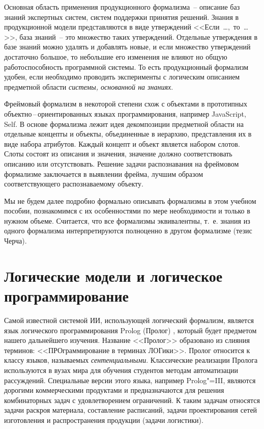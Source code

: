 \documentclass[a4paper,14pt, openany, twoside, final]{extbook} %
\begin{document}
Основная область применения продукционного формализма~-- описание баз знаний экспертных систем, систем поддержки принятия решений.  Знания в продукционной модели представляются в виде утверждений <<Если\ \ldots{},\ то\ \ldots{}>>, база знаний~-- это множество таких утверждений.  Отдельные утверждения в базе знаний можно удалять и добавлять новые, и если множество утверждений достаточно большое, то небольшие его изменения не влияют но общую работоспособность программной системы.  То есть продукционный формализм удобен, если необходимо проводить эксперименты с логическим описанием предметной области \emph{системы, основанной на знаниях}.

Фреймовый формализм в некоторой степени схож с объектами в прототипных объектно\,--\,ориентированных языках программирования, например JavaScript, Self.  В основе формализма лежит идея декомпозиции предметной области на отдельные концепты и объекты, объединенные в иерархию, представления их в виде набора атрибутов.  Каждый концепт и объект является набором слотов.  Слоты состоят из описания и значения, значение должно соответствовать описанию или отсутствовать.  Решение задачи распознавания на фреймовом формализме заключается в выявлении фрейма, лучшим образом соответствующего распознаваемому объекту.

Мы не будем далее подробно формально описывать формализмы в этом учебном пособии, познакомимся с их особенностями по мере необходимости и только в нужном объеме.  Считается, что все формализмы эквивалентны, т.~е. знания из одного формализма интерпретируются полноценно в другом формализме (тезис Черча).

\chapter{Логические модели и логическое программирование}

Самой известной системой ИИ, использующей логический формализм, является язык логического программирования \foreignlanguage{english}{Prolog} (Пролог) \cite{Bratko}, который будет предметом нашего дальнейшего изучения.  Название <<Пролог>> образовано из слияния терминов: <<ПРОграммирование в терминах ЛОГики>>. Пролог относится к классу языков, называемых \emph{сентенциальными}.  Классические реализации Пролога используются в вузах мира для обучения студентов методам автоматизации рассуждений.  Специальные версии этого языка, например Prolog"=III, являются дорогими коммерческими продуктами и предназначаются для решения комбинаторных задач с удовлетворением ограничений.  К таким задачам относятся задачи раскроя материала, составление расписаний, задачи проектирования сетей изготовления и распространения продукции (задачи логистики).
\end{document}

